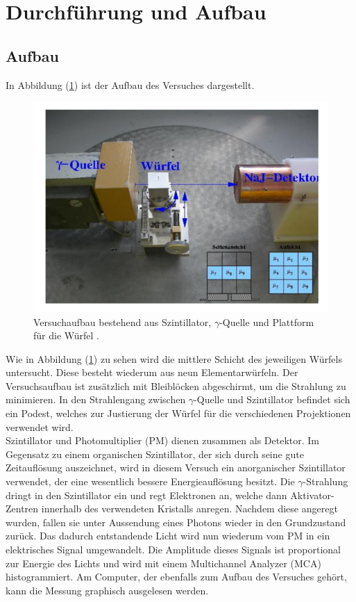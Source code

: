 \section{Durchführung und Aufbau}
\label{sec:Durchführung}
\subsection{Aufbau}
In Abbildung (\ref{fig:aufbau}) ist der Aufbau des Versuches dargestellt.
\begin{figure}
	\centering
	\includegraphics[scale=0.5]{fig/aufbau.png}
	\caption{Versuchaufbau bestehend aus Szintillator, $\gamma$-Quelle und Plattform für die Würfel \cite[2]{Anleitung}.}
	\label{fig:aufbau}
\end{figure}
\FloatBarrier
\noindent Wie in Abbildung (\ref{fig:aufbau}) zu sehen wird die mittlere Schicht des jeweiligen Würfels untersucht. Diese besteht wiederum aus neun Elementarwürfeln. Der Versuchsaufbau
ist zusätzlich mit Bleiblöcken abgeschirmt, um die Strahlung zu minimieren. In den Strahlengang zwischen $\gamma$-Quelle und Szintillator befindet sich ein Podest, welches zur Justierung
der Würfel für die verschiedenen Projektionen verwendet wird.\\
Szintillator und Photomultiplier (PM) dienen zusammen als Detektor. Im Gegensatz zu einem organischen Szintillator, der sich durch seine gute Zeitauflösung auszeichnet, wird in diesem Versuch ein anorganischer Szintillator verwendet, der eine wesentlich bessere Energieauflösung
besitzt. Die $\gamma$-Strahlung dringt in den Szintillator ein und regt Elektronen an, welche dann Aktivator-Zentren innerhalb des verwendeten Kristalls anregen. Nachdem diese angeregt
wurden, fallen sie unter Aussendung eines Photons wieder in den Grundzustand zurück. Das dadurch entstandende Licht wird nun wiederum vom PM in ein elektrisches Signal umgewandelt. Die
Amplitude dieses Signals ist proportional zur Energie des Lichts und wird mit einem Multichannel Analyzer (MCA) histogrammiert. Am Computer, der ebenfalls zum Aufbau des Versuches gehört, kann die Messung graphisch ausgelesen werden.
